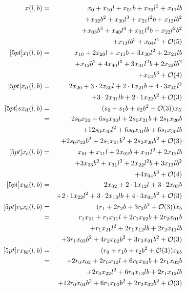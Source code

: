 \documentclass[jog]{svjour}
\begin{document}
\begin{eqnarray}
\label{eq:11}
x(l,b)=&& x_0+x_{10}l+x_{01}b+x_{20}l^2+x_{11}lb\\
 && +x_{02}b^2+x_{30}l^3+x_{21}l^2b+x_{12}lb^2\nonumber\\
 && +x_{03}b^3+x_{40}l^4+x_{31}l^3b+x_{22}l^2b^2\nonumber\\
 && +x_{13}lb^3+x_{04}l^4+{\cal O}(5)\nonumber\\
[5pt]
\label{eq:12}
x_l(l,b)=&& x_{10}+2x_{20}l+x_{11}b+3x_{30}l^2+2x_{21}lb\\
 && +x_{12}b^2+4x_{40}l^3+3x_{31}l^2b+2x_{22}lb^2\nonumber\\
 && +x_{13}b^3+{\cal O}(4)\nonumber\\
[5pt]
\label{eq:13}
x_{ll}(l,b)=&& 2x_{20}+3\cdot 2x_{30}l+2\cdot 1x_{21}b+4\cdot 3x_{40}l^2\\
 && +3\cdot 2x_{31}lb+2\cdot 1x_{22}b^2+{\cal O}(3)\nonumber\\
[5pt]
\label{eq:14}
sx_{ll}(l,b)=&& (s_0+s_1b+s_2b^2+{\cal O}(3))x_{ll}\\
 =&& 2s_0x_{20}+6s_0x_{30}l+2s_0x_{21}b+2s_1x_{20}b\nonumber\\
 && +12s_0x_{40}l^2+6s_0x_{31}lb+6s_1x_{30}lb\nonumber\\
 && +2s_0x_{22}b^2+2s_1x_{21}b^2+2s_2x_{20}b^2+{\cal O}(3)\nonumber\\
[5pt]
\label{eq:15}
x_b(l,b)=&& x_{01}+x_{11}l+2x_{02}b+x_{21}l^2+2x_{12}lb\\
 && +3x_{03}b^2+x_{31}l^3+2x_{22}l^2b+3x_{13}lb^2\nonumber\\
 && +4x_{04}b^3+{\cal O}(4)\nonumber\\
[5pt]
\label{eq:16}
x_{bb}(l,b)=&& 2x_{02}+2 \cdot 1 x_{12}l+3\cdot 2x_{03}b\\
 &&+2\cdot 1 x_{22}l^2+3\cdot 2x_{13}lb+4\cdot 3x_{04}b^2+{\cal O}(3)\nonumber\\
[5pt]
\label{eq:17}
r_bx_b(l,b)=&& (r_1+2r_2b+3r_3b^2+{\cal O}(3))x_b\\
 =&& r_1x_{01}+r_1x_{11}l+2r_1x_{02}b+2r_2x_{01}b\nonumber\\
 && +r_1x_{21}l^2+2r_1x_{12}lb+2r_2x_{11}lb\nonumber\\
 && +3r_1x_{03}b^2+4r_2x_{02}b^2+3r_3x_{01}b^2+{\cal O}(3)\nonumber\\
[5pt]
\label{eq:18}
rx_{bb}(l,b)=&& (r_0+r_1b+r_2b^2+{\cal O}(3))x_{bb}\\
 =&& +2r_0x_{02}+2r_0x_{12}l+6r_0x_{03}b+2r_1x_{02}b\nonumber\\
 && +2r_0x_{22}l^2+6r_0x_{13}lb+2r_1x_{12}lb\nonumber\\
 && +12r_0x_{04}b^2+6r_1x_{03}b^2+2r_2x_{02}b^2+{\cal O}(3)\nonumber
\end{eqnarray}
\end{document}

